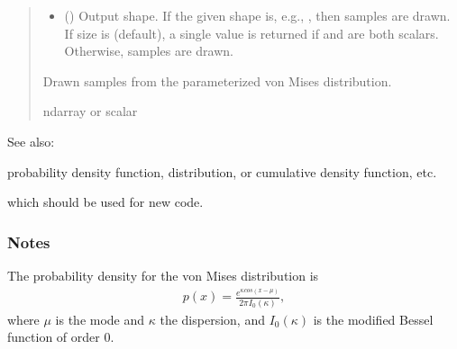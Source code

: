 \documentclass[letterpaper,10pt,english]{sphinxmanual}
\begin{document}
\begin{fulllineitems}
\begin{quote}
\begin{description}
\begin{itemize}
\item {} 
\sphinxAtStartPar
{} (\sphinxstyleliteralemphasis{\sphinxupquote{, }}) \textendash{} Output shape.  If the given shape is, e.g., , then
 samples are drawn.  If size is  (default),
a single value is returned if  and  are both scalars.
Otherwise,  samples are drawn.

\end{itemize}

\sphinxAtStartPar
{} \textendash{} Drawn samples from the parameterized von Mises distribution.

\sphinxAtStartPar
ndarray or scalar

\end{description}\end{quote}


\begin{sphinxseealso}{See also:}
\begin{description}
\sphinxAtStartPar
probability density function, distribution, or cumulative density function, etc.

\sphinxAtStartPar
which should be used for new code.

\end{description}


\end{sphinxseealso}

\subsubsection*{Notes}

\sphinxAtStartPar
The probability density for the von Mises distribution is
\begin{equation*}
\begin{split}p(x) = \frac{e^{\kappa cos(x-\mu)}}{2\pi I_0(\kappa)},\end{split}
\end{equation*}
\sphinxAtStartPar
where \(\mu\) is the mode and \(\kappa\) the dispersion,
and \(I_0(\kappa)\) is the modified Bessel function of order 0.


\end{fulllineitems}
\end{document}
